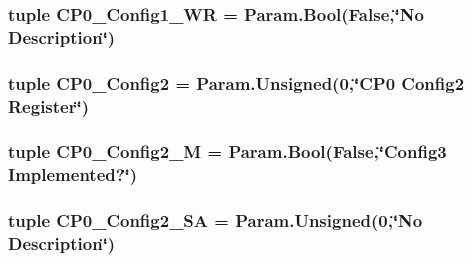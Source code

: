 \label{classMipsCPU_1_1BaseMipsCPU_a97539887d1811697a726dfb4e531f8f4}
\hypertarget{classMipsCPU_1_1BaseMipsCPU_af6cad75219ec70f7eac3771410ba2370}{
\subsubsection[{CP0\_\-Config1\_\-WR}]{\setlength{\rightskip}{0pt plus 5cm}tuple {\bf CP0\_\-Config1\_\-WR} = Param.Bool(False,\char`\"{}No Description\char`\"{})}}
\label{classMipsCPU_1_1BaseMipsCPU_af6cad75219ec70f7eac3771410ba2370}
\hypertarget{classMipsCPU_1_1BaseMipsCPU_a8469209fa548a8b86a04d0780ff8689e}{
\subsubsection[{CP0\_\-Config2}]{\setlength{\rightskip}{0pt plus 5cm}tuple {\bf CP0\_\-Config2} = Param.Unsigned(0,\char`\"{}CP0 Config2 {\bf Register}\char`\"{})}}
\label{classMipsCPU_1_1BaseMipsCPU_a8469209fa548a8b86a04d0780ff8689e}
\hypertarget{classMipsCPU_1_1BaseMipsCPU_acb8e6fbe796168bf9985cd93259df5a9}{
\subsubsection[{CP0\_\-Config2\_\-M}]{\setlength{\rightskip}{0pt plus 5cm}tuple {\bf CP0\_\-Config2\_\-M} = Param.Bool(False,\char`\"{}Config3 Implemented?\char`\"{})}}
\label{classMipsCPU_1_1BaseMipsCPU_acb8e6fbe796168bf9985cd93259df5a9}
\hypertarget{classMipsCPU_1_1BaseMipsCPU_a288566473c627d5d943bdb535070c6a8}{
\subsubsection[{CP0\_\-Config2\_\-SA}]{\setlength{\rightskip}{0pt plus 5cm}tuple {\bf CP0\_\-Config2\_\-SA} = Param.Unsigned(0,\char`\"{}No Description\char`\"{})}}
